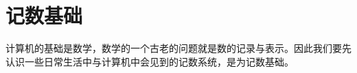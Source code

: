 \chapter{记数基础}\label{ch:NumberSystemBasics}
    计算机的基础是数学，数学的一个古老的问题就是数的记录与表示。因此我们要先认识一些日常生活中与计算机中会见到的记数系统，是为记数基础。
